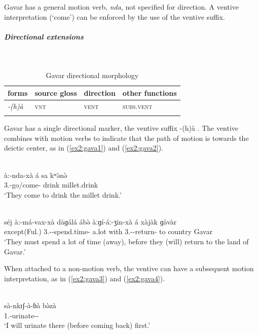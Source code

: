 Gavar has a general motion verb, \textit{nda}, not specified for direction. A ventive interpretation (`come') can be enforced by the use of the ventive suffix.

\subparagraph{Directional extensions}~

\begin{table}[H]
	\caption{Gavar directional morphology}
	\label{tab:gava}
	\begin{tabular}{llll} %
		\lsptoprule
		forms & source gloss & direction  & other functions  \\ %
		\midrule
		\textit{-(h)à}  &  \textsc{vnt}  &   \textsc{vent} &  \textsc{subs.vent}  \\
		\lspbottomrule
	\end{tabular}
\end{table} 

Gavar has a single directional marker, the ventive suffix -(h)à \citep{viljoenGavarVerbPhrase2017}. The ventive combines with motion verbs to indicate that the path of motion is towards the deictic center, as in (\ref{ex2:gava1}) and (\ref{ex2:gava2}). 

\ea\label{ex2:gava1}
 \\
\gll à:-nda-xà	á	sa	kʷə̀nə̀	 \\
3.-go/come-		drink	millet.drink \\
\glt `They come to drink the millet drink.'

\ex\label{ex2:gava2}
 \\
\gll  séj	à:-má-vax-xà	dàɡálá	ábə̀	àːɡí-áː-ʒin-xà	á	xàjàk	ɡàvàr \\
except(Ful.)	3.--spend.time-	a.lot	with	3.--return-	to	country	Gavar \\
\glt `They must spend a lot of time (away), before they (will) return to the land of Gavar.'
\z 

When attached to a non-motion verb, the ventive can have a subsequent motion interpretation, as in (\ref{ex2:gava3}) and (\ref{ex2:gava4}).

\ea\label{ex2:gava3}
 \\
\gll  sà-nkɪʃ-à-ɓà	bə̀zà \\
1.-urinate--	 \\
\glt `I will urinate there (before coming back) first.'


